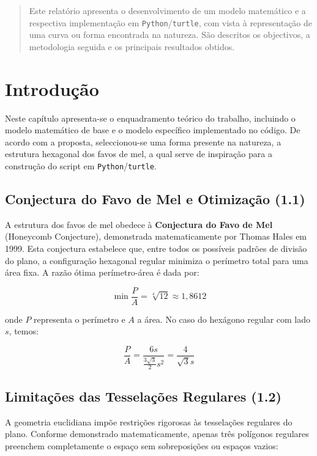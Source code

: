 \documentclass[12pt,a4paper,oneside]{extarticle}
\begin{document}

\begin{abstract}
Este relatório apresenta o desenvolvimento de um modelo matemático e a respectiva implementação em \texttt{Python}/\texttt{turtle}, com vista à representação de uma curva ou forma encontrada na natureza. São descritos os objectivos, a metodologia seguida e os principais resultados obtidos. 
\end{abstract}

\section{Introdução}
Neste capítulo apresenta-se o enquadramento teórico do trabalho, incluindo o modelo matemático de base e o modelo específico implementado no código.  
De acordo com a proposta, seleccionou-se uma forma presente na natureza, a estrutura hexagonal dos favos de mel, a qual serve de inspiração para a construção do script em \texttt{Python}/\texttt{turtle}.

\subsection{Conjectura do Favo de Mel e Otimização (1.1)}
A estrutura dos favos de mel obedece à \textbf{Conjectura do Favo de Mel} (Honeycomb Conjecture), demonstrada matematicamente por Thomas Hales em 1999. Esta conjectura estabelece que, entre todos os possíveis padrões de divisão do plano, a configuração hexagonal regular minimiza o perímetro total para uma área fixa. A razão ótima perímetro-área é dada por:

\begin{equation}
\min \frac{P}{A} = \sqrt[4]{12} \approx 1,8612
\label{eq:honeycomb_conjecture}
\end{equation}

onde $P$ representa o perímetro e $A$ a área. No caso do hexágono regular com lado $s$, temos:

\begin{equation}
\frac{P}{A} = \frac{6s}{\frac{3\sqrt{3}}{2}s^2} = \frac{4}{\sqrt{3}s}
\label{eq:hexagon_ratio}
\end{equation}

\subsection{Limitações das Tesselações Regulares (1.2)}
A geometria euclidiana impõe restrições rigorosas às tesselações regulares do plano. Conforme demonstrado matematicamente, apenas três polígonos regulares preenchem completamente o espaço sem sobreposições ou espaços vazios:
\end{document}
